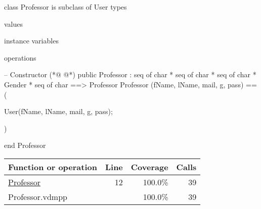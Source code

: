 \begin{vdmpp}[breaklines=true]
class Professor is subclass of User
types

values

instance variables
 

operations

 -- Constructor
(*@
\label{Professor:12}
@*)
 public Professor : seq of char * seq of char * seq of char * Gender * seq of char ==> Professor
 Professor (fName, lName, mail, g, pass) == (
 
  User(fName, lName, mail, g, pass);
 
 )
  
   
 
end Professor
\end{vdmpp}
\bigskip
\begin{longtable}{|l|r|r|r|}
\hline
Function or operation & Line & Coverage & Calls \\
\hline
\hline
\hyperref[Professor:12]{Professor} & 12&100.0\% & 39 \\
\hline
\hline
Professor.vdmpp & & 100.0\% & 39 \\
\hline
\end{longtable}

